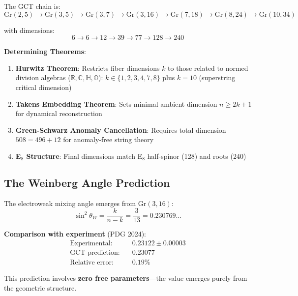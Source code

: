 \documentclass[11pt,a4paper]{article}
\newcommand{\Gr}{\mathrm{Gr}}
\newcommand{\R}{\mathbb{R}}
\newcommand{\C}{\mathbb{C}}
\newcommand{\HH}{\mathbb{H}}
\newcommand{\OO}{\mathbb{O}}
\begin{document}
The GCT chain is:
\begin{equation}
    \Gr(2,5) \to \Gr(3,5) \to \Gr(3,7) \to \Gr(3,16) \to \Gr(7,18) \to \Gr(8,24) \to \Gr(10,34)
\end{equation}

with dimensions:
\begin{equation}
    6 \to 6 \to 12 \to 39 \to 77 \to 128 \to 240
\end{equation}

\textbf{Determining Theorems}:

\begin{enumerate}
    \item \textbf{Hurwitz Theorem}: Restricts fiber dimensions $k$ to those related to normed division algebras ($\R, \C, \HH, \OO$): $k \in \{1, 2, 3, 4, 7, 8\}$ plus $k=10$ (superstring critical dimension)

    \item \textbf{Takens Embedding Theorem}: Sets minimal ambient dimension $n \geq 2k+1$ for dynamical reconstruction

    \item \textbf{Green-Schwarz Anomaly Cancellation}: Requires total dimension $508 = 496 + 12$ for anomaly-free string theory

    \item \textbf{E$_8$ Structure}: Final dimensions match E$_8$ half-spinor (128) and roots (240)
\end{enumerate}

\subsection{The Weinberg Angle Prediction}

The electroweak mixing angle emerges from $\Gr(3,16)$:
\begin{equation}
    \sin^2\theta_W = \frac{k}{n-k} = \frac{3}{13} = 0.230769\ldots
\end{equation}

\textbf{Comparison with experiment} (PDG 2024):
\begin{align}
    \text{Experimental:} & \quad 0.23122 \pm 0.00003 \\
    \text{GCT prediction:} & \quad 0.23077 \\
    \text{Relative error:} & \quad 0.19\%
\end{align}

This prediction involves \textbf{zero free parameters}---the value emerges purely from the geometric structure.
\end{document}

